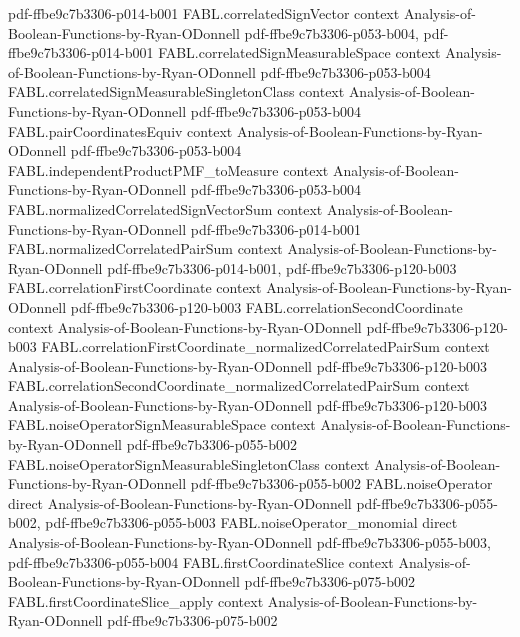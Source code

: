 \begin{theorem}
  {pdf-ffbe9c7b3306-p014-b001}
\proofstep
  {FABL.correlatedSignVector}
  {context}
  {Analysis-of-Boolean-Functions-by-Ryan-ODonnell}
  {pdf-ffbe9c7b3306-p053-b004,
    pdf-ffbe9c7b3306-p014-b001}
\proofstep
  {FABL.correlatedSignMeasurableSpace}
  {context}
  {Analysis-of-Boolean-Functions-by-Ryan-ODonnell}
  {pdf-ffbe9c7b3306-p053-b004}
\proofstep
  {FABL.correlatedSignMeasurableSingletonClass}
  {context}
  {Analysis-of-Boolean-Functions-by-Ryan-ODonnell}
  {pdf-ffbe9c7b3306-p053-b004}
\proofstep
  {FABL.pairCoordinatesEquiv}
  {context}
  {Analysis-of-Boolean-Functions-by-Ryan-ODonnell}
  {pdf-ffbe9c7b3306-p053-b004}
\proofstep
  {FABL.independentProductPMF_toMeasure}
  {context}
  {Analysis-of-Boolean-Functions-by-Ryan-ODonnell}
  {pdf-ffbe9c7b3306-p053-b004}
\proofstep
  {FABL.normalizedCorrelatedSignVectorSum}
  {context}
  {Analysis-of-Boolean-Functions-by-Ryan-ODonnell}
  {pdf-ffbe9c7b3306-p014-b001}
\proofstep
  {FABL.normalizedCorrelatedPairSum}
  {context}
  {Analysis-of-Boolean-Functions-by-Ryan-ODonnell}
  {pdf-ffbe9c7b3306-p014-b001,
    pdf-ffbe9c7b3306-p120-b003}
\proofstep
  {FABL.correlationFirstCoordinate}
  {context}
  {Analysis-of-Boolean-Functions-by-Ryan-ODonnell}
  {pdf-ffbe9c7b3306-p120-b003}
\proofstep
  {FABL.correlationSecondCoordinate}
  {context}
  {Analysis-of-Boolean-Functions-by-Ryan-ODonnell}
  {pdf-ffbe9c7b3306-p120-b003}
\proofstep
  {FABL.correlationFirstCoordinate_normalizedCorrelatedPairSum}
  {context}
  {Analysis-of-Boolean-Functions-by-Ryan-ODonnell}
  {pdf-ffbe9c7b3306-p120-b003}
\proofstep
  {FABL.correlationSecondCoordinate_normalizedCorrelatedPairSum}
  {context}
  {Analysis-of-Boolean-Functions-by-Ryan-ODonnell}
  {pdf-ffbe9c7b3306-p120-b003}
\proofstep
  {FABL.noiseOperatorSignMeasurableSpace}
  {context}
  {Analysis-of-Boolean-Functions-by-Ryan-ODonnell}
  {pdf-ffbe9c7b3306-p055-b002}
\proofstep
  {FABL.noiseOperatorSignMeasurableSingletonClass}
  {context}
  {Analysis-of-Boolean-Functions-by-Ryan-ODonnell}
  {pdf-ffbe9c7b3306-p055-b002}
\proofstep
  {FABL.noiseOperator}
  {direct}
  {Analysis-of-Boolean-Functions-by-Ryan-ODonnell}
  {pdf-ffbe9c7b3306-p055-b002,
    pdf-ffbe9c7b3306-p055-b003}
\proofstep
  {FABL.noiseOperator_monomial}
  {direct}
  {Analysis-of-Boolean-Functions-by-Ryan-ODonnell}
  {pdf-ffbe9c7b3306-p055-b003,
    pdf-ffbe9c7b3306-p055-b004}
\proofstep
  {FABL.firstCoordinateSlice}
  {context}
  {Analysis-of-Boolean-Functions-by-Ryan-ODonnell}
  {pdf-ffbe9c7b3306-p075-b002}
\proofstep
  {FABL.firstCoordinateSlice_apply}
  {context}
  {Analysis-of-Boolean-Functions-by-Ryan-ODonnell}
  {pdf-ffbe9c7b3306-p075-b002}

\end{theorem}
